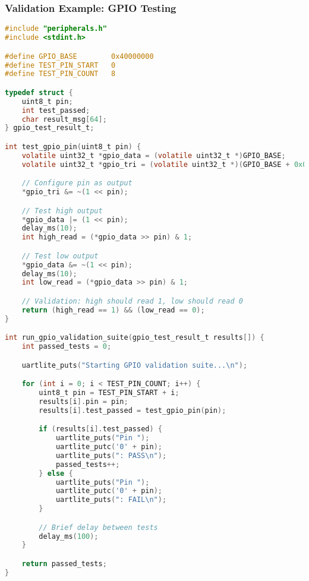 \documentclass{beamer}
\begin{document}
\begin{frame}[fragile]
\frametitle{Validation Example: GPIO Testing}
\begin{lstlisting}[language=C, basicstyle=\fontsize{6}{6}\selectfont\ttfamily]
#include "peripherals.h"
#include <stdint.h>

#define GPIO_BASE        0x40000000
#define TEST_PIN_START   0
#define TEST_PIN_COUNT   8

typedef struct {
    uint8_t pin;
    int test_passed;
    char result_msg[64];
} gpio_test_result_t;

int test_gpio_pin(uint8_t pin) {
    volatile uint32_t *gpio_data = (volatile uint32_t *)GPIO_BASE;
    volatile uint32_t *gpio_tri = (volatile uint32_t *)(GPIO_BASE + 0x04);

    // Configure pin as output
    *gpio_tri &= ~(1 << pin);

    // Test high output
    *gpio_data |= (1 << pin);
    delay_ms(10);
    int high_read = (*gpio_data >> pin) & 1;

    // Test low output
    *gpio_data &= ~(1 << pin);
    delay_ms(10);
    int low_read = (*gpio_data >> pin) & 1;

    // Validation: high should read 1, low should read 0
    return (high_read == 1) && (low_read == 0);
}

int run_gpio_validation_suite(gpio_test_result_t results[]) {
    int passed_tests = 0;

    uartlite_puts("Starting GPIO validation suite...\n");

    for (int i = 0; i < TEST_PIN_COUNT; i++) {
        uint8_t pin = TEST_PIN_START + i;
        results[i].pin = pin;
        results[i].test_passed = test_gpio_pin(pin);

        if (results[i].test_passed) {
            uartlite_puts("Pin ");
            uartlite_putc('0' + pin);
            uartlite_puts(": PASS\n");
            passed_tests++;
        } else {
            uartlite_puts("Pin ");
            uartlite_putc('0' + pin);
            uartlite_puts(": FAIL\n");
        }

        // Brief delay between tests
        delay_ms(100);
    }

    return passed_tests;
}
\end{lstlisting}
\end{frame}
\end{document}
